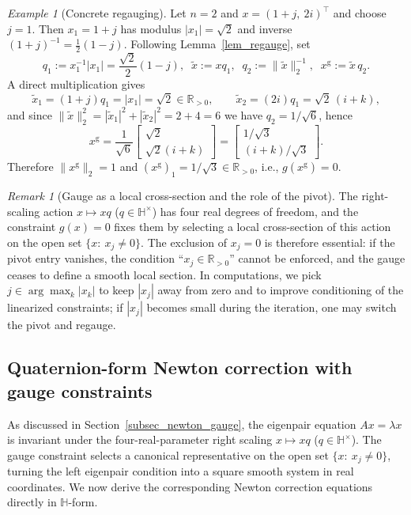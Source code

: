 \documentclass[preprint,12pt]{elsarticle}  %
\theoremstyle{definition}
\theoremstyle{definition}
\theoremstyle{definition}
\theoremstyle{definition}
\theoremstyle{definition}
\theoremstyle{remark}
\newtheorem{Rem}{Remark}
\theoremstyle{remark}
\newtheorem{Ex}{Example}
\theoremstyle{remark}
\DeclareRobustCommand{\i}{\ensuremath{\mathbf{i}}}
\DeclareRobustCommand{\j}{\ensuremath{\mathbf{j}}}
\DeclareRobustCommand{\k}{\ensuremath{\mathbf{k}}}
\def\i{i}\def\j{j}\def\k{k}%
\newcommand{\RR}{\mathbb{R}}
\newcommand{\HH}{\mathbb{H}}
\begin{document}
\begin{Ex}[Concrete regauging]
\label{ex_regauge_concrete}
Let $n=2$ and $x=(1+\j,\ 2\i)^\top$ and choose $j=1$.
Then $x_1=1+\j$ has modulus $|x_1|=\sqrt{2}$ and inverse $(1+\j)^{-1}=\tfrac12(1-\j)$.
Following Lemma~\ref{lem_regauge}, set
\[
q_1:=x_1^{-1}|x_1|=\frac{\sqrt{2}}{2}(1-\j),\;\; \tilde x:=xq_1,
\;\; q_2:=\|\tilde x\|_2^{-1},\;\; x^{\mathrm g}:=\tilde x\,q_2.
\]
A direct multiplication gives
\[
\tilde x_1=(1+\j)q_1=|x_1|=\sqrt{2}\in\RR_{>0},\qquad
\tilde x_2=(2\i)q_1=\sqrt{2}\,(\i+\k),
\]
and since $\|\tilde x\|_2^2=|\tilde x_1|^2+|\tilde x_2|^2=2+4=6$ we have $q_2=1/\sqrt{6}$, hence
\[
x^{\mathrm g}
=\frac{1}{\sqrt{6}}\begin{bmatrix}\sqrt{2}\\ \sqrt{2}(\i+\k)\end{bmatrix}
=\begin{bmatrix}1/\sqrt{3}\\ (\i+\k)/\sqrt{3}\end{bmatrix}.
\]
Therefore $\|x^{\mathrm g}\|_2=1$ and $(x^{\mathrm g})_1=1/\sqrt{3}\in\RR_{>0}$, i.e., $g(x^{\mathrm g})=0$.
\end{Ex}

\begin{Rem}[Gauge as a local cross-section and the role of the pivot]
\label{rem_quaternionic_phase}
The right-scaling action $x\mapsto xq$ ($q\in\HH^\times$) has four real degrees of freedom, and the constraint $g(x)=0$ fixes them by selecting a local cross-section of this action on the open set $\{x:\ x_j\neq 0\}$.
The exclusion of $x_j=0$ is therefore essential: if the pivot entry vanishes, the condition ``$x_j\in\RR_{>0}$'' cannot be enforced, and the gauge ceases to define a smooth local section.
In computations, we pick $j\in\arg\max_k |x_k|$ to keep $|x_j|$ away from zero and to improve conditioning of the linearized constraints; if $|x_j|$ becomes small during the iteration, one may switch the pivot and regauge.
\end{Rem}

\subsection{Quaternion-form Newton correction with gauge constraints}
\label{subsec_newton_derivation}
As discussed in Section~\ref{subsec_newton_gauge}, the eigenpair equation $Ax=\lambda x$ is invariant under the four-real-parameter right scaling $x\mapsto xq$ ($q\in\HH^\times$). The gauge constraint selects a canonical representative on the open set $\{x:\ x_j\neq 0\}$, turning the left eigenpair condition into a square smooth system in real coordinates. We now derive the corresponding Newton correction equations directly in $\HH$-form.
\end{document}
